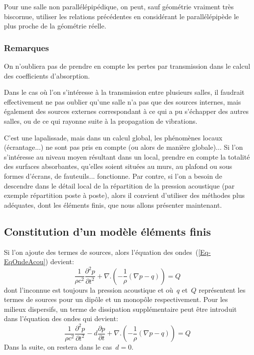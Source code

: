 {Pour une salle non parallélépipédique, on peut, sauf géométrie vraiment très biscornue, utiliser les relations précédentes en considérant le parallélépipède le plus proche de la géométrie réelle.

\medskip
\subsubsection{Remarques}

On n'oubliera pas de prendre en compte les pertes par transmission dans le calcul des coefficients d'absorption.

\medskip
Dans le cas où l'on s'intéresse à la transmission entre plusieurs salles, il faudrait effectivement ne pas oublier qu'une salle n'a pas que des sources internes, mais également des sources externes correspondant à ce qui a pu s'échapper des autres salles, ou de ce qui rayonne suite à la propagation de vibrations.

\medskip
C'est une lapalissade, mais dans un calcul global, les phénomènes locaux (écrantage...) ne sont pas pris en compte (ou alors de manière globale)...
Si l'on s'intéresse au niveau moyen résultant dans un local, prendre en compte la totalité des surfaces absorbantes, qu'elles soient situées au murs, au plafond ou sous formes d'écrans, de fauteuils... fonctionne.
Par contre, si l'on a besoin de descendre dans le détail local de la répartition de la pression acoustique (par exemple répartition poste à poste), alors il convient d'utiliser des méthodes plus adéquates, dont les éléments finis, que nous allons présenter maintenant.

\medskip
\subsection{Constitution d'un modèle éléments finis}

Si l'on ajoute des termes de sources, alors l'équation des ondes~(\ref{Eq-EqOndeAcou}) devient:
\begin{equation}\label{Eq-OndeSrc}
\dfrac{1}{\rho c^2}\dfrac{\partial^2p}{\partial t^2}+\nabla.\left(-\dfrac{1}{\rho}(\nabla p-q)\right)=Q
\end{equation}
dont l'inconnue est toujours la pression acoustique et où~$q$ et~$Q$ représentent les termes de sources pour un dipôle et un monopôle respectivement.
Pour les milieux dispersifs, un terme de dissipation supplémentaire peut être introduit dans l'équation des ondes qui devient:
\begin{equation}
\dfrac{1}{\rho c^2}\dfrac{\partial^2p}{\partial t^2}-d\dfrac{\partial p}{\partial t}+\nabla.\left(-\dfrac{1}{\rho}(\nabla p-q)\right)=Q
\end{equation}
Dans la suite, on restera dans le cas~$d=0$.

}
